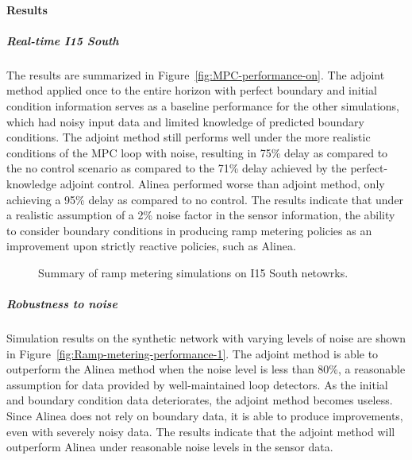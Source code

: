 \paragraph{Results}


\subparagraph{Real-time I15 South}

The results are summarized in Figure~\ref{fig:MPC-performance-on}.
The adjoint method applied once to the entire horizon with perfect
boundary and initial condition information serves as a baseline performance
for the other simulations, which had noisy input data and limited
knowledge of predicted boundary conditions. The adjoint method still
performs well under the more realistic conditions of the MPC loop
with noise, resulting in 75\% delay as compared to the no control
scenario as compared to the 71\% delay achieved by the perfect-knowledge
adjoint control. Alinea performed worse than adjoint method, only
achieving a 95\% delay as compared to no control. The results indicate
that under a realistic assumption of a 2\% noise factor in the sensor
information, the ability to consider boundary conditions in producing
ramp metering policies as an improvement upon strictly reactive policies,
such as Alinea.

\begin{figure}
\hfill{}
\caption{Summary of ramp metering simulations on I15 South netowrks.}
\end{figure}



\subparagraph{Robustness to noise}

Simulation results on the synthetic network with varying levels of
noise are shown in Figure~\ref{fig:Ramp-metering-performance-1}.
The adjoint method is able to outperform the Alinea method when the
noise level is less than 80\%, a reasonable assumption for data provided
by well-maintained loop detectors. As the initial and boundary condition
data deteriorates, the adjoint method becomes useless. Since Alinea
does not rely on boundary data, it is able to produce improvements,
even with severely noisy data. The results indicate that the adjoint
method will outperform Alinea under reasonable noise levels in the
sensor data.
